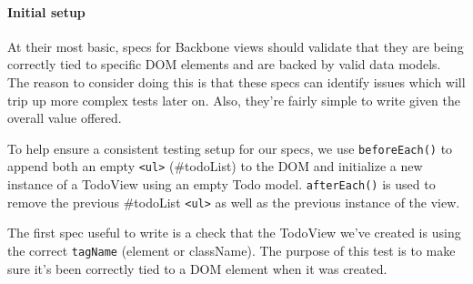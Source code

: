 \documentclass[9pt]{book}
\newenvironment{Shaded}{}{}
\newcommand{\KeywordTok}[1]{\textcolor[rgb]{0.00,0.44,0.13}{\textbf{{#1}}}}
\newcommand{\DataTypeTok}[1]{\textcolor[rgb]{0.56,0.13,0.00}{{#1}}}
\newcommand{\StringTok}[1]{\textcolor[rgb]{0.25,0.44,0.63}{{#1}}}
\newcommand{\OtherTok}[1]{\textcolor[rgb]{0.00,0.44,0.13}{{#1}}}
\newcommand{\FunctionTok}[1]{\textcolor[rgb]{0.02,0.16,0.49}{{#1}}}
\newcommand{\NormalTok}[1]{{#1}}
\begin{document}
\paragraph{Initial setup}\label{initial-setup}

At their most basic, specs for Backbone views should validate that they
are being correctly tied to specific DOM elements and are backed by
valid data models. The reason to consider doing this is that these specs
can identify issues which will trip up more complex tests later on.
Also, they're fairly simple to write given the overall value offered.

To help ensure a consistent testing setup for our specs, we use
\texttt{beforeEach()} to append both an empty
\texttt{\textless{}ul\textgreater{}} (\#todoList) to the DOM and
initialize a new instance of a TodoView using an empty Todo model.
\texttt{afterEach()} is used to remove the previous \#todoList
\texttt{\textless{}ul\textgreater{}} as well as the previous instance of
the view.

\begin{Shaded}
\end{Shaded}

The first spec useful to write is a check that the TodoView we've
created is using the correct \texttt{tagName} (element or className).
The purpose of this test is to make sure it's been correctly tied to a
DOM element when it was created.
\end{document}
